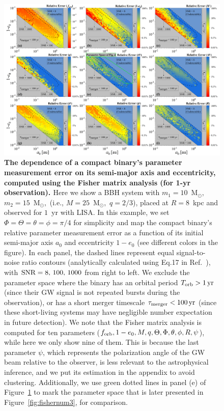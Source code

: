 \documentclass[%
 reprint,
 amsmath,amssymb,
 aps,
]{revtex4-2}
\begin{document}
\begin{figure}[htbp]
    \centering
    \includegraphics[width=7.5in]{Fisher_numerical.png} 
    \caption{{\bf{The dependence of a compact binary's parameter measurement error on its semi-major axis and eccentricity, computed using the Fisher matrix analysis (for 1-yr observation). }}
    Here we show a BBH system with $m_{1}=10$~M$_{\odot},$ $m_{2}=15$~M$_{\odot},$ (i.e., $M=25$~M$_{\odot},$ $q=2/3$), placed at
    $R=8$~kpc and observed for $1$~yr with LISA. In this example, we set $\Phi=\Theta=\theta=\phi=\pi/4$ for simplicity and map the compact binary's relative parameter measurement error as a function of its initial semi-major axis $a_0$ and eccentricity $1-e_0$ (see different colors in the figure). 
    In each panel, the dashed lines represent equal signal-to-noise ratio contours (analytically calculated using Eq.17 in Ref.~\citep{Xuan+23b}), with $\rm SNR=8,\, 100,\, 1000$ from right to left. We exclude the parameter space where the binary has an orbital period $T_{\rm orb} > 1\,\rm yr$ (since their GW signal is not repeated bursts during the observation), or has a short merger timescale $\tau_{\rm merger} < 100\,\rm yr$ (since these short-living systems may have negligible number expectation in future detection). We note that the Fisher matrix analysis is computed for ten parameters ($f_{\rm orb}, 1-e_0, M, q, \Theta, \Phi, \theta,\phi, R,\psi$), while here we only show nine of them. This is because the last parameter $\psi$, which represents the polarization angle of the GW beam relative to the observer, is less relevant to the astrophysical inference, and we put its estimation in the appendix to avoid clustering. Additionally, we use green dotted lines in panel (e) of Figure~\ref{fig:fishernum} to mark the parameter space that is later presented in Figure~\ref{fig:fishernum3}, for comparison.}
    
    \label{fig:fishernum}
\end{figure}
\end{document}
